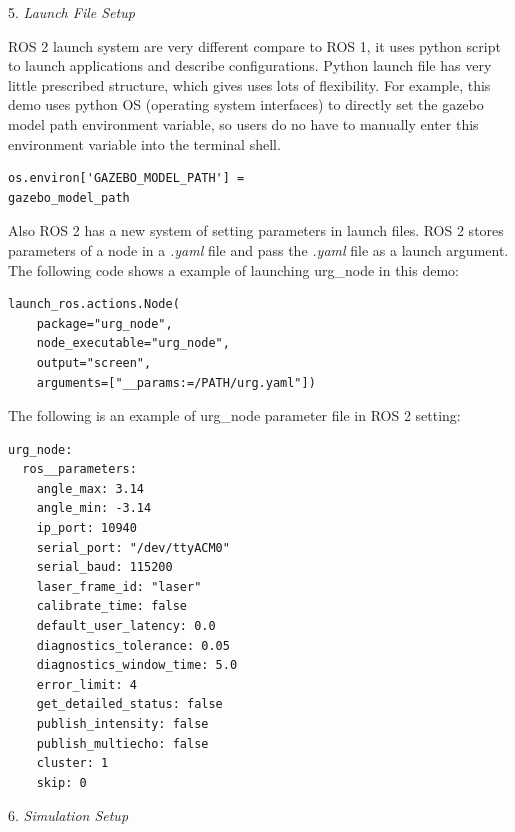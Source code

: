 \documentclass[letterpaper, 10 pt, conference]{ieeeconf}  %
\begin{document}
5. \textit{Launch File Setup} \par\vspace{5pt}
ROS 2 launch system are very different compare to ROS 1, it uses python script to launch applications and describe configurations. Python launch file has very little prescribed structure, which gives uses lots of flexibility. For example, this demo uses python OS (operating system interfaces) to directly set the gazebo model path environment variable, so users do no have to manually enter this environment variable into the terminal shell. 
\par\vspace{2pt}
\begin{small}
\begin{verbatim}
os.environ['GAZEBO_MODEL_PATH'] =
gazebo_model_path
\end{verbatim}
\end{small}
\par\vspace{2pt}
Also ROS 2 has a new system of setting parameters in launch files. ROS 2 stores parameters of a node in a \textit{.yaml} file and pass the \textit{.yaml} file as a launch argument. The following code shows a example of launching urg\_node in this demo: \par\vspace{2pt}
\begin{small}
\begin{verbatim}
launch_ros.actions.Node(
    package="urg_node",
    node_executable="urg_node",
    output="screen",
    arguments=["__params:=/PATH/urg.yaml"])
\end{verbatim}
\end{small}\par\vspace{2pt}
The following is an example of urg\_node parameter file in ROS 2 setting: 
\begin{small}
\begin{verbatim}
urg_node:
  ros__parameters:
    angle_max: 3.14
    angle_min: -3.14
    ip_port: 10940
    serial_port: "/dev/ttyACM0"
    serial_baud: 115200
    laser_frame_id: "laser"
    calibrate_time: false
    default_user_latency: 0.0
    diagnostics_tolerance: 0.05
    diagnostics_window_time: 5.0
    error_limit: 4
    get_detailed_status: false
    publish_intensity: false
    publish_multiecho: false
    cluster: 1
    skip: 0
\end{verbatim}
\end{small}{}
6. \textit{Simulation Setup} \par\vspace{5pt} 
\end{document}
